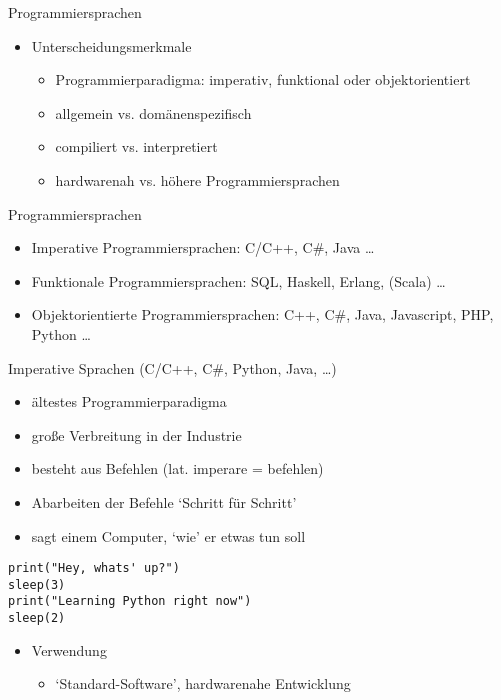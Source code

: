 \begin{frame}{Programmiersprachen}
    \begin{itemize}
        \item Unterscheidungsmerkmale
            \begin{itemize}
                \item Programmierparadigma: imperativ, funktional oder objektorientiert            
                \item allgemein vs. domänenspezifisch
                \item compiliert vs. interpretiert
                \item hardwarenah vs. höhere Programmiersprachen
            \end{itemize}
    \end{itemize}
\end{frame}

\begin{frame}[fragile]{Programmiersprachen}
    \begin{itemize}
        \item Imperative Programmiersprachen: C/C++, C\#, Java \dots
        \item Funktionale Programmiersprachen: SQL, Haskell, Erlang, (Scala) \dots
        \item Objektorientierte Programmiersprachen: C++, C\#, Java, Javascript, PHP, Python \dots
    \end{itemize}
\end{frame}

\begin{frame}[fragile]{Imperative Sprachen (C/C++, C\#, Python, Java, \dots)}
    \begin{itemize}
        \item ältestes Programmierparadigma
        \item große Verbreitung in der Industrie
        \item besteht aus Befehlen (lat. imperare = befehlen)
        \item Abarbeiten der Befehle `Schritt für Schritt'
        \item sagt einem Computer, `wie' er etwas tun soll
    \end{itemize}
    \begin{lstlisting}
print("Hey, whats' up?")
sleep(3)
print("Learning Python right now")
sleep(2)
    \end{lstlisting}
    \begin{itemize}
        \item Verwendung
            \begin{itemize}
                \item `Standard-Software', hardwarenahe Entwicklung
            \end{itemize}
    \end{itemize}
\end{frame}

